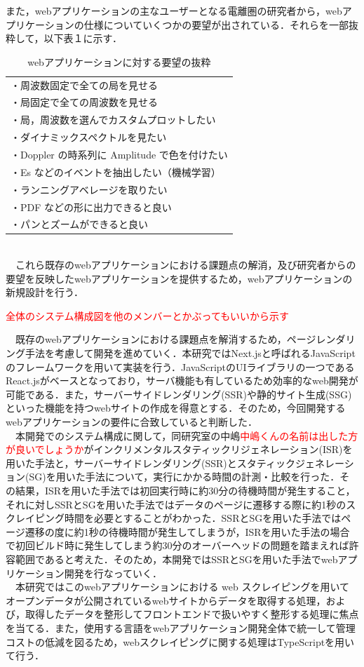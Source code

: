 また，webアプリケーションの主なユーザーとなる電離圏の研究者から，webアプリケーションの仕様についていくつかの要望が出されている．それらを一部抜粋して，以下表１に示す．\\
\begin{table}[h]
  \centering
  \caption{webアプリケーションに対する要望の抜粋}
  \begin{tabular}{l}
  \toprule
    ・周波数固定で全ての局を見せる\\
    ・局固定で全ての周波数を見せる\\
    ・局，周波数を選んでカスタムプロットしたい\\
    ・ダイナミックスペクトルを見たい\\
    ・Doppler の時系列に Amplitude で色を付けたい\\
    ・Es などのイベントを抽出したい（機械学習）\\
    ・ランニングアベレージを取りたい\\
    ・PDF などの形に出力できると良い\\
    ・パンとズームができると良い
  \end{tabular}
\end{table}\\
　これら既存のwebアプリケーションにおける課題点の解消，及び研究者からの要望を反映したwebアプリケーションを提供するため，webアプリケーションの新規設計を行う．

\textcolor{red}{全体のシステム構成図を他のメンバーとかぶってもいいから示す}

　既存のwebアプリケーションにおける課題点を解消するため，ページレンダリング手法を考慮して開発を進めていく．本研究ではNext.jsと呼ばれるJavaScriptのフレームワークを用いて実装を行う．JavaScriptのUIライブラリの一つであるReact.jsがベースとなっており，サーバ機能も有しているため効率的なweb開発が可能である．また，サーバーサイドレンダリング(SSR)や静的サイト生成(SSG)といった機能を持つwebサイトの作成を得意とする．そのため，今回開発するwebアプリケーションの要件に合致していると判断した．\cite{next}\\
　本開発でのシステム構成に関して，同研究室の中嶋\textcolor{red}{中嶋くんの名前は出した方が良いでしょうか}がインクリメンタルスタティックリジェネレーション(ISR)を用いた手法と，サーバーサイドレンダリング(SSR)とスタティックジェネレーション(SG)を用いた手法について，実行にかかる時間の計測・比較を行った．その結果，ISRを用いた手法では初回実行時に約30分の待機時間が発生すること，それに対しSSRとSGを用いた手法ではデータのページに遷移する際に約1秒のスクレイピング時間を必要とすることがわかった．SSRとSGを用いた手法ではページ遷移の度に約1秒の待機時間が発生してしまうが，ISRを用いた手法の場合で初回ビルド時に発生してしまう約30分のオーバーヘッドの問題を踏まえれば許容範囲であると考えた．そのため，本開発ではSSRとSGを用いた手法でwebアプリケーション開発を行なっていく．\cite{shu_sotsuken}\\
　本研究ではこのwebアプリケーションにおける web スクレイピングを用いてオープンデータが公開されているwebサイトからデータを取得する処理，および，取得したデータを整形してフロントエンドで扱いやすく整形する処理に焦点を当てる．また，使用する言語をwebアプリケーション開発全体で統一して管理コストの低減を図るため，webスクレイピングに関する処理はTypeScriptを用いて行う．\\


